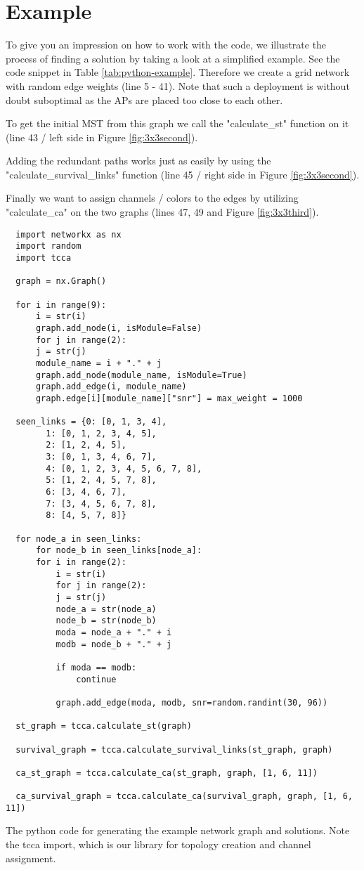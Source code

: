   \section{Example}
    To give you an impression on how to work with the code, we illustrate the process of finding a solution by taking a look at a simplified example.
    See the code snippet in Table \ref{tab:python-example}.
    Therefore we create a grid network with random edge weights (line 5 - 41).
    Note that such a deployment is without doubt suboptimal as the APs are placed too close to each other.

    To get the initial \ac{MST} from this graph we call the "calculate\_st" function on it (line 43 / left side in Figure \ref{fig:3x3second}).
    
    Adding the redundant paths works just as easily by using the "calculate\_survival\_links" function (line 45 / right side in Figure \ref{fig:3x3second}).
    
    Finally we want to assign channels / colors to the edges by utilizing "calculate\_ca" on the two graphs (lines 47, 49 and Figure \ref{fig:3x3third}).
    
    \newpage
    
    \begin{table}[h!]
    \lstset{language=Python}
    \begin{lstlisting}
  import networkx as nx
  import random
  import tcca

  graph = nx.Graph()

  for i in range(9):
      i = str(i)
      graph.add_node(i, isModule=False)
      for j in range(2):
	  j = str(j)
	  module_name = i + "." + j
	  graph.add_node(module_name, isModule=True)
	  graph.add_edge(i, module_name)
	  graph.edge[i][module_name]["snr"] = max_weight = 1000

  seen_links = {0: [0, 1, 3, 4], 
		1: [0, 1, 2, 3, 4, 5], 
		2: [1, 2, 4, 5], 
		3: [0, 1, 3, 4, 6, 7], 
		4: [0, 1, 2, 3, 4, 5, 6, 7, 8], 
		5: [1, 2, 4, 5, 7, 8], 
		6: [3, 4, 6, 7], 
		7: [3, 4, 5, 6, 7, 8], 
		8: [4, 5, 7, 8]}

  for node_a in seen_links:
      for node_b in seen_links[node_a]:
	  for i in range(2):
	      i = str(i)
	      for j in range(2):
		  j = str(j)
		  node_a = str(node_a)
		  node_b = str(node_b)
		  moda = node_a + "." + i
		  modb = node_b + "." + j

		  if moda == modb:
		      continue

		  graph.add_edge(moda, modb, snr=random.randint(30, 96))

  st_graph = tcca.calculate_st(graph)

  survival_graph = tcca.calculate_survival_links(st_graph, graph)

  ca_st_graph = tcca.calculate_ca(st_graph, graph, [1, 6, 11])

  ca_survival_graph = tcca.calculate_ca(survival_graph, graph, [1, 6, 11])
    \end{lstlisting}
    \caption{The python code for generating the example network graph and solutions. 
      Note the tcca import, which is our library for topology creation and channel assignment.}
    \label{tab:python-example}
  \end{table}
  

